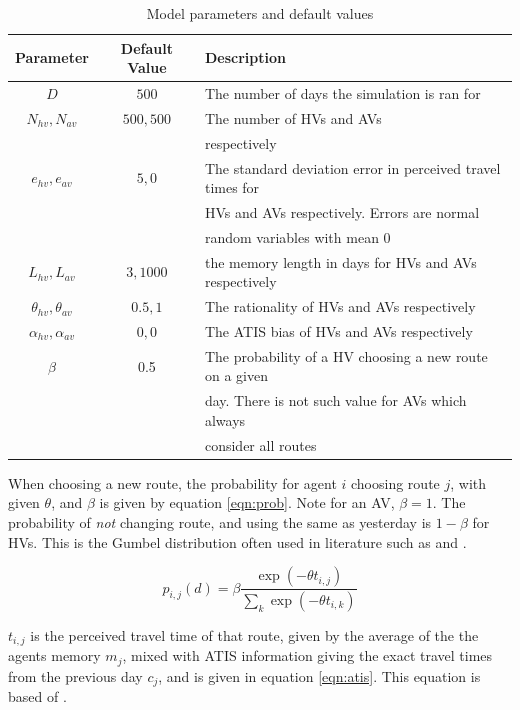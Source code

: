 \documentclass[12pt, a4paper, onecolumn]{article}
\begin{document}
\begin{table}[h!]
	\begin{center}
		\caption{Model parameters and default values}
		\label{tab:params}
		\begin{tabular}{c|c|l}
			\hline
			Parameter & Default Value & Description \\
			\hline
			$D$ & $500$ & The number of days the simulation is ran for\\
			$N_{hv}, N_{av}$ & $500, 500$ & The number of HVs and AVs \\
			& & respectively\\
			$e_{hv}, e_{av}$ & $5,0$ & The standard deviation error in perceived travel times for \\
			& & HVs and AVs respectively. Errors are normal  \\
			& & random variables with mean 0\\
			$L_{hv}, L_{av}$ & $3, 1000$ & the memory length in days for HVs and AVs respectively\\
			$\theta_{hv}, \theta_{av} $ & $ 0.5, 1 $ & The rationality of HVs and AVs respectively\\
			$\alpha_{hv}, \alpha_{av}$ & $0, 0 $ & The ATIS bias of HVs and AVs respectively\\
			$\beta$ & 0.5 & The probability of a HV choosing a new route on a given \\ 
			& &  day. There is not such value for AVs which always \\ 
			& &  consider all routes\\
			\hline
			\end{tabular}
		\end{center}
	\end{table}

When choosing a new route, the probability for agent $i$ choosing route $j$, with given $\theta$, and $\beta$ is given by equation \ref{eqn:prob}. Note for an AV, $\beta = 1$. The probability of \textit{not} changing route, and using the same as yesterday is $1-\beta$ for HVs. This is the Gumbel distribution often used in literature such as \cite{Zheng2013} and \cite{Liu2007}.

\begin{equation}
	p_{i,j}(d) = \beta \frac{\exp \left(-\theta t_{i, j}\right)}{\sum_{k} \exp \left(-\theta t_{i, k}\right)}
	\label{eqn:prob}
	\end{equation}

$t_{i, j}$ is the perceived travel time of that route, given by the average of the the agents memory $m_{j}$, mixed with ATIS information giving the exact travel times from the previous day $c_{j}$, and is given in equation \ref{eqn:atis}. This equation is based of \cite{Liu2007}.
\end{document}
